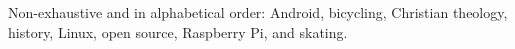 
\inlineheadsection %
{Non-exhaustive and in alphabetical order:}
{
Android, bicycling, Christian theology, history, Linux, open source, Raspberry Pi, and skating.
}
